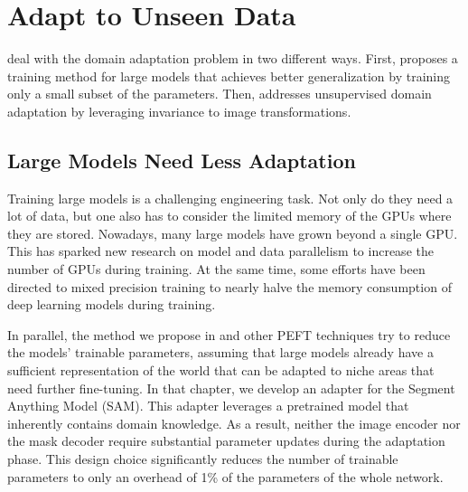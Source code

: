 
\section{Adapt to Unseen Data}\label{sec:disc_adapt}
 deal with the domain adaptation problem in two different ways. First,  proposes a training method for large models that achieves better generalization by training only a small subset of the parameters. Then,  addresses unsupervised domain adaptation by leveraging invariance to image transformations.

\subsection{Large Models Need Less Adaptation}
Training large models is a challenging engineering task. Not only do they need a lot of data, but one also has to consider the limited memory of the GPUs where they are stored. Nowadays, many large models have grown beyond a single GPU. This has sparked new research on model and data parallelism to increase the number of GPUs during training. At the same time, some efforts have been directed to mixed precision training to nearly halve the memory consumption of deep learning models during training.

In parallel, the method we propose in  and other PEFT techniques try to reduce the models' trainable parameters, assuming that large models already have a sufficient representation of the world that can be adapted to niche areas that need further fine-tuning. In that chapter, we develop an adapter for the Segment Anything Model (SAM). This adapter leverages a pretrained model that inherently contains domain knowledge. As a result, neither the image encoder nor the mask decoder require substantial parameter updates during the adaptation phase. This design choice significantly reduces the number of trainable parameters to only an overhead of 1\% of the parameters of the whole network.

